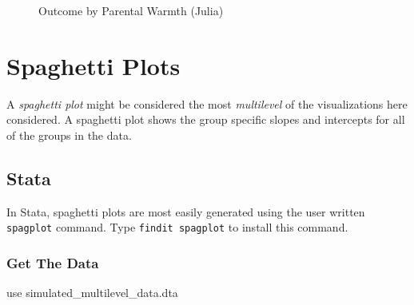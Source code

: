\documentclass[
  letterpaper,
  DIV=11,
  numbers=noendperiod]{scrreprt}
\newenvironment{Shaded}{\begin{snugshade}}{\end{snugshade}}
\newcommand{\KeywordTok}[1]{\textcolor[rgb]{0.00,0.23,0.31}{#1}}
\newcommand{\NormalTok}[1]{\textcolor[rgb]{0.00,0.23,0.31}{#1}}
\begin{document}
\begin{figure}[H]


\caption{\label{fig-Julialfit}Outcome by Parental Warmth (Julia)}

\end{figure}%

\section{Spaghetti Plots}\label{spaghetti-plots}

A \emph{spaghetti plot} might be considered the most \emph{multilevel}
of the visualizations here considered. A spaghetti plot shows the group
specific slopes and intercepts for all of the groups in the data.

\subsection{Stata}

In Stata, spaghetti plots are most easily generated using the user
written \texttt{spagplot} command. Type \texttt{findit\ spagplot} to
install this command.

\subsubsection{Get The Data}\label{get-the-data-6}

\begin{Shaded}
\begin{Highlighting}[]

\KeywordTok{use}\NormalTok{ simulated\_multilevel\_data.dta}
\end{Highlighting}
\end{Shaded}
\end{document}
